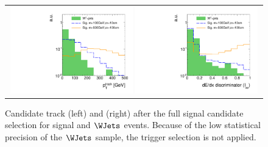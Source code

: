 \begin{figure}[!h]
  \centering 
  \begin{tabular}{c}
    \includegraphics[width=0.49\textwidth]{figures/analysis/AnalysisSelection/chiTracksfullSelectionNoTriggerCuts_Wjets/htrackPtSmallRangeCoarseBinning_log.pdf}
    \includegraphics[width=0.49\textwidth]{figures/analysis/AnalysisSelection/chiTracksfullSelectionNoTriggerCuts_Wjets/htrackASmiSmallRange_log.pdf}
  \end{tabular}
  \caption{Candidate track \pt (left) and \ias (right) after the full signal candidate selection for signal and $\WJets$ events. 
           Because of the low statistical precision of the $\WJets$ sample, the trigger selection is not applied.
           }
  \label{fig:PtAndIasAfterFullPreselection}
\end{figure}



